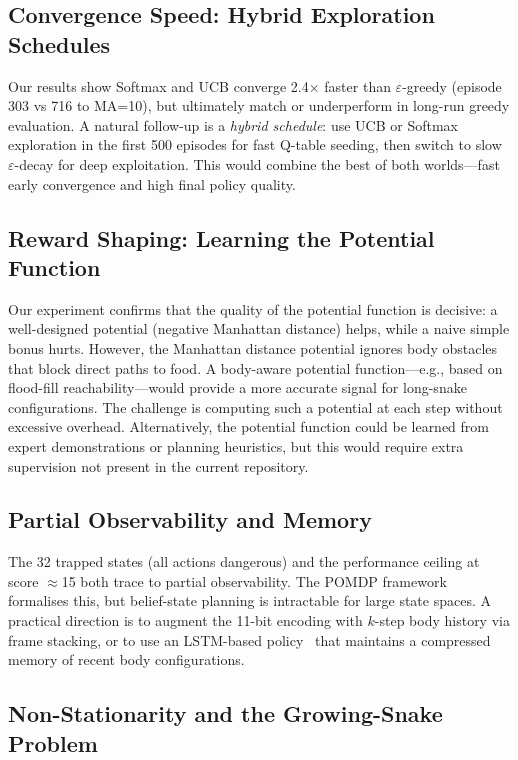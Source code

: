 \documentclass[10pt,conference]{IEEEtran}
\begin{document}
\subsection{Convergence Speed: Hybrid Exploration Schedules}

Our results show Softmax and UCB converge 2.4$\times$ faster
than $\varepsilon$-greedy (episode 303 vs 716 to MA=10),
but ultimately match or underperform in long-run greedy evaluation.
A natural follow-up is a \emph{hybrid schedule}: use UCB or Softmax
exploration in the first 500 episodes for fast Q-table seeding,
then switch to slow $\varepsilon$-decay for deep exploitation.
This would combine the best of both worlds---fast early convergence
and high final policy quality.

\subsection{Reward Shaping: Learning the Potential Function}

Our experiment confirms that the quality of the potential function
is decisive: a well-designed potential (negative Manhattan distance)
helps, while a naive simple bonus hurts.
However, the Manhattan distance potential ignores body obstacles
that block direct paths to food.
A body-aware potential function---e.g., based on flood-fill
reachability---would provide a more accurate signal for
long-snake configurations.
The challenge is computing such a potential at each step without
excessive overhead.
Alternatively, the potential function could be learned from expert
demonstrations or planning heuristics, but this would require extra
supervision not present in the current repository.

\subsection{Partial Observability and Memory}

The 32 trapped states (all actions dangerous) and the performance
ceiling at score $\approx$15 both trace to partial observability.
The POMDP framework~\cite{kaelbling1998planning} formalises this,
but belief-state planning is intractable for large state spaces.
A practical direction is to augment the 11-bit encoding with
$k$-step body history via frame stacking, or to use an LSTM-based
policy~\cite{kapturowski2018recurrent} that maintains a compressed
memory of recent body configurations.

\subsection{Non-Stationarity and the Growing-Snake Problem}
\end{document}
